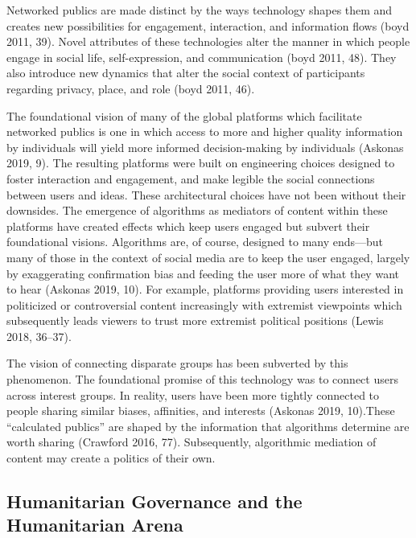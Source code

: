 Networked publics are made distinct by the ways technology shapes them
and creates new possibilities for engagement, interaction, and
information flows (boyd 2011, 39). Novel attributes of these
technologies alter the manner in which people engage in social life,
self-expression, and communication (boyd 2011, 48). They also introduce
new dynamics that alter the social context of participants regarding
privacy, place, and role (boyd 2011, 46).

The foundational vision of many of the global platforms which facilitate
networked publics is one in which access to more and higher quality
information by individuals will yield more informed decision-making by
individuals (Askonas 2019, 9). The resulting platforms were built on
engineering choices designed to foster interaction and engagement, and
make legible the social connections between users and ideas. These
architectural choices have not been without their downsides. The
emergence of algorithms as mediators of content within these platforms
have created effects which keep users engaged but subvert their
foundational visions. Algorithms are, of course, designed to many
ends---but many of those in the context of social media are to keep the
user engaged, largely by exaggerating confirmation bias and feeding the
user more of what they want to hear (Askonas 2019, 10). For example,
platforms providing users interested in politicized or controversial
content increasingly with extremist viewpoints which subsequently leads
viewers to trust more extremist political positions (Lewis 2018,
36--37).

The vision of connecting disparate groups has been subverted by this
phenomenon. The foundational promise of this technology was to connect
users across interest groups. In reality, users have been more tightly
connected to people sharing similar biases, affinities, and interests
(Askonas 2019, 10).These ``calculated publics'' are shaped by the
information that algorithms determine are worth sharing (Crawford 2016,
77). Subsequently, algorithmic mediation of content may create a
politics of their own.

\hypertarget{humanitarian-governance-and-the-humanitarian-arena}{%
\subsection{Humanitarian Governance and the Humanitarian
Arena}\label{humanitarian-governance-and-the-humanitarian-arena}}

